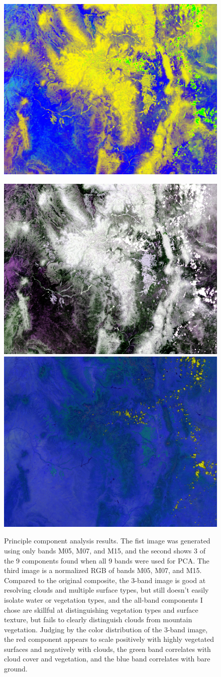 \documentclass[12pt]{article}
\begin{document}
\begin{figure}[h!]
    \centering
    \includegraphics[width=.6\linewidth]{figures/p7/pca_4+6+8_eq.png}

    \vspace{.2em}
    \includegraphics[width=.4\linewidth]{figures/p7/pca_0+3+5_eq.png}
    \includegraphics[width=.4\linewidth]{figures/p7/region_M05+M07+M15.png}
    \caption{Principle component analysis results. The fist image was generated using only bands M05, M07, and M15, and the second shows 3 of the 9 components found when all 9 bands were used for PCA. The third image is a normalized RGB of bands M05, M07, and M15. Compared to the original composite, the 3-band image is good at resolving clouds and multiple surface types, but still doesn't easily isolate water or vegetation types, and the all-band components I chose are skillful at distinguishing vegetation types and surface texture, but fails to clearly distinguish clouds from mountain vegetation. Judging by the color distribution of the 3-band image, the red component appears to scale positively with highly vegetated surfaces and negatively with clouds, the green band correlates with cloud cover and vegetation, and the blue band correlates with bare ground.}
    \label{p7_results}
\end{figure}
\end{document}
